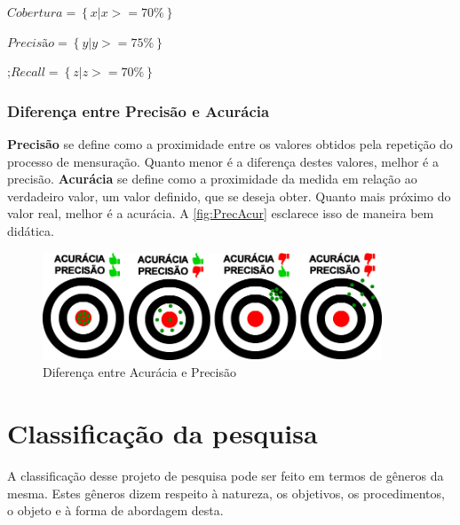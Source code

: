 \documentclass[
	12pt,				%
	openright,			%
	oneside,
	a4paper,			%
	english,			%
	french,				%
	spanish,			%
	brazil,				%
	]{abntex2}
\begin{document}
$Cobertura = \left \{ x | x >= 70\% \right \}$

$Precisão = \left \{ y | y >= 75\% \right \}$

;$Recall = \left \{ z | z >= 70\% \right \}$
\subsubsection{Diferença entre Precisão e Acurácia} \label{dif}

\textbf{Precisão} se define como a proximidade entre os valores obtidos pela repetição do processo de mensuração. Quanto menor é a diferença destes valores, melhor é a precisão. \textbf{Acurácia} se define como a proximidade da medida em relação ao verdadeiro valor, um valor definido, que se deseja obter. Quanto mais próximo do valor real, melhor é a acurácia. A \autoref{fig:PrecAcur} esclarece isso de maneira bem didática.

\begin{figure}
    \centering
    \includegraphics[width=0.9\textwidth]{Modelo_Projeto_Pesquisa_UFG_REJ_BCC/PrecisaoAcuracia.jpg}
    \caption{Diferença entre Acurácia e Precisão}
    \label{fig:PrecAcur}
\end{figure}


\section{Classificação da pesquisa}
\label{sec:classif}
A classificação desse projeto de pesquisa pode ser feito em termos de gêneros da mesma. Estes gêneros dizem respeito à natureza, os objetivos, os procedimentos, o objeto e à forma de abordagem desta.
\end{document}
